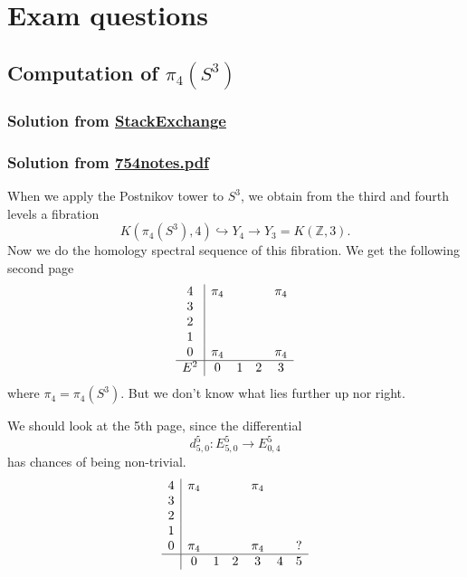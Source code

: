 \documentclass{article}
\numberwithin{equation}{section}
\begin{document}
\section{Exam questions}\label{sec:Exam questions}
\subsection{Computation of $\pi_{4}(S^{3})$}
\subsubsection{Solution from  \href{https://math.stackexchange.com/questions/1102897/computing-pi-4s3-using-serre-spectral-sequence}{StackExchange}}


\subsubsection{Solution from \href{https://people.math.wisc.edu/~lmaxim/754notes.pdf}{754notes.pdf}}
When we apply the Postnikov tower to $S^{3}$, we obtain from the third and fourth levels a fibration
\[K(\pi_{4}(S^{3}),4)\hookrightarrow Y_{4}\to Y_3=K(\mathbb{Z},3).\]
Now we do the homology spectral sequence of this fibration. We get the following second page
	\begin{align*}
		\begin{array}{c|c c c c}
			4&\pi_{4}&&&\pi_{4}\\
			3&&&&\\
			2&&&&\\
			1&&&&\\
			0&\pi_4&&&\pi_4\\
			\hline
			E^{2}&0&1&2&3
		\end{array}
	\end{align*}
	where $\pi_4=\pi_{4}(S^{3})$. But we don't know what lies further up nor right.

	We should look at the 5th page, since the differential
	\[d^{5}_{5,0}:E^{5}_{5,0}\to E^{5}_{0,4}\]
	has chances of being non-trivial.
	\begin{align*}
		\begin{array}{c|c c c c c c}
			4&\pi_{4}&&&\pi_{4}&&\\
			3&&&&&&\\
			2&&&&&&\\
			1&&&&&&\\
			0&\pi_4&&&\pi_4&&?\\
			\hline
			&0&1&2&3&4&5
		\end{array}
	\end{align*}
\end{document}
